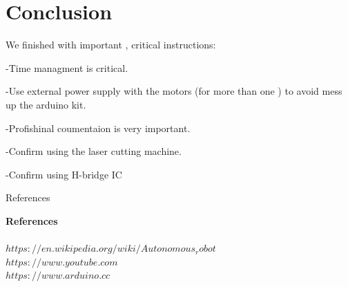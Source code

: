 \documentclass[11pt]{report}
\begin{document}
		

	
	\newpage
	\chapter{Conclusion}
	
	We finished with important , critical instructions:
	
		-Time managment is critical.
		
		-Use external power supply with the motors (for more than one ) to  avoid mess up the arduino kit.
		
		-Profishinal coumentaion is very important.
		
		-Confirm using the laser cutting machine.
		
		-Confirm using H-bridge IC
		
		 
	
	\newpage
	\begin{appendix}
		\listtablename{ References} \\
	\end{appendix}
	
	
	\begin{appendix}
		\listoffigures
	\end{appendix}
	
	\begin{newpage}
		\maketitle
		\textbf{\Huge References	}
		\\ \\ $https://en.wikipedia.org/wiki/Autonomous_robot$ 
		\\$https://www.youtube.com$ 
		\\$https://www.arduino.cc$
		
	\end{newpage}
\end{document}
